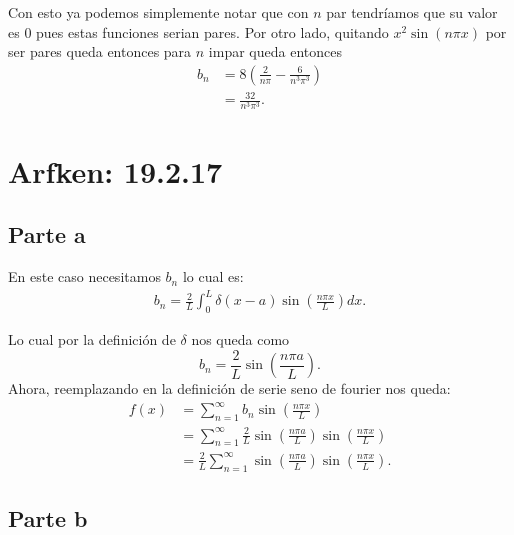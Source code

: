 \documentclass{report}
\begin{document}
Con esto ya podemos simplemente notar que con $n$ par tendríamos que su valor es 0 pues estas funciones serian pares. Por otro lado, quitando $x^2\sin\left( n \pi x \right) $ por ser pares queda entonces para $n$ impar queda entonces
\begin{align*}
  b_n &= 8 \left( \frac{2}{n\pi} - \frac{6}{n^{3}\pi^{3}} \right) \\
  &= \frac{32}{n^{3}\pi^{3}}
.\end{align*}


\chapter{Arfken: 19.2.17}

\section{Parte a}

En este caso necesitamos $b_n$ lo cual es:
\begin{align*}
  b_n = \frac{2}{L}\int_0^{L} \delta\left( x - a \right) \sin\left( \frac{n\pi x}{L} \right) dx
.\end{align*}

Lo cual por la definición de $\delta$ nos queda como  \[
b_n = \frac{2}{L}\sin\left( \frac{n \pi a}{L} \right)
.\] Ahora, reemplazando en la definición de serie seno de fourier nos queda:
\begin{align*}
  f(x) &= \sum_{n=1}^{\infty} b_n \sin\left( \frac{n\pi x}{L} \right)  \\
  &= \sum_{n=1}^{\infty} \frac{2}{L}\sin\left( \frac{n\pi a}{L} \right) \sin\left( \frac{n \pi x}{L} \right)  \\
  &= \frac{2}{L}\sum_{n=1}^{\infty} \sin\left( \frac{n\pi a}{L} \right) \sin\left( \frac{n \pi x}{L} \right)
.\end{align*}

\section{Parte b}
\end{document}
